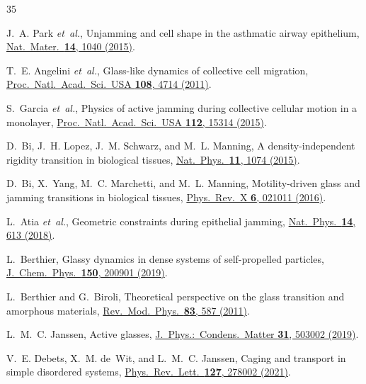 \documentclass[aps,pre,twocolumn,superscriptaddress,longbibliography,floatfix]{revtex4-2}
\begin{document}
\begin{thebibliography}{35}

J.~A. Park \textit{et~al.},
Unjamming and cell shape in the asthmatic airway epithelium,
\href{https://doi.org/10.1038/nmat4357}{Nat.\ Mater.\ \textbf{14}, 1040 (2015)}.

T.~E. Angelini \textit{et~al.},
Glass-like dynamics of collective cell migration,
\href{https://doi.org/10.1073/pnas.1010059108}{Proc.\ Natl.\ Acad.\ Sci.\ USA \textbf{108}, 4714 (2011)}.

S.~Garcia \textit{et~al.},
Physics of active jamming during collective cellular motion in a
monolayer,
\href{https://doi.org/10.1073/pnas.1510973112}{Proc.\ Natl.\ Acad.\ Sci.\ USA \textbf{112}, 15314 (2015)}.

D.~Bi, J.~H. Lopez, J.~M. Schwarz, and M.~L. Manning,
A density-independent rigidity transition in biological tissues,
\href{https://doi.org/10.1038/nphys3471}{Nat.\ Phys.\ \textbf{11}, 1074 (2015)}.

D.~Bi, X.~Yang, M.~C. Marchetti, and M.~L. Manning,
Motility-driven glass and jamming transitions in biological tissues,
\href{https://doi.org/10.1103/PhysRevX.6.021011}{Phys.\ Rev.\ X \textbf{6}, 021011 (2016)}.

L.~Atia \textit{et~al.},
Geometric constraints during epithelial jamming,
\href{https://doi.org/10.1038/s41567-018-0089-9}{Nat.\ Phys.\ \textbf{14}, 613 (2018)}.

L.~Berthier,
Glassy dynamics in dense systems of self-propelled particles,
\href{https://doi.org/10.1063/1.5093240}{J.\ Chem.\ Phys.\ \textbf{150}, 200901 (2019)}.

L.~Berthier and G.~Biroli,
Theoretical perspective on the glass transition and amorphous
materials,
\href{https://doi.org/10.1103/RevModPhys.83.587}{Rev.\ Mod.\ Phys.\ \textbf{83}, 587 (2011)}.

L.~M.~C. Janssen,
Active glasses,
\href{https://doi.org/10.1088/1361-648X/ab3e90}{J.\ Phys.:\ Condens.\ Matter \textbf{31}, 503002 (2019)}.

V.~E. Debets, X.~M. de~Wit, and L.~M.~C. Janssen,
Caging and transport in simple disordered systems,
\href{https://doi.org/10.1103/PhysRevLett.127.278002}{Phys.\ Rev.\ Lett.\ \textbf{127}, 278002 (2021)}.


\end{thebibliography}
\end{document}
